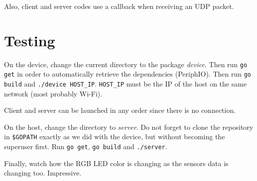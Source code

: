 \documentclass[11pt,a4paper]{article}
\begin{document}
Also, client and server codes use a callback when receiving an UDP packet.

\section{Testing}
On the device, change the current directory to the package \emph{device}. Then run \texttt{go get} in order to automatically retrieve the dependencies (PeriphIO). Then run \texttt{go build} and \texttt{./device HOST\_IP}. \texttt{HOST\_IP} must be the IP of the host on the same network (most probably Wi-Fi).

Client and server can be launched in any order since there is no connection.

On the host, change the directory to \emph{server}. Do not forget to clone the repository in \texttt{\$GOPATH} exactly as we did with the device, but without becoming the superuser first. Run \texttt{go get}, \texttt{go build} and \texttt{./server}.

Finally, watch how the RGB LED color is changing as the sensors data is changing too. Impressive.
\end{document}
